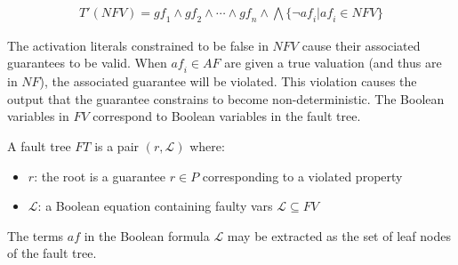 \begin{gather*}
T'(\mathit{NFV}) = \mathit{gf}_1 \land \mathit{gf}_2 \land \cdots \land \mathit{gf}_n \land \bigwedge \{\neg \mathit{af}_i | \mathit{af}_i \in \mathit{NFV} \}
\end{gather*}

The activation literals constrained to be false in $\mathit{NFV}$ cause their associated guarantees to be valid. When $\mathit{af}_i \in \mathit{AF}$ are given a true valuation (and thus are in $\mathit{NF}$), the associated guarantee will be violated. This violation causes the output that the guarantee constrains to become non-deterministic. The Boolean variables in $\mathit{FV}$ correspond to Boolean variables in the fault tree. 



\begin{definition}
A fault tree $\mathit{FT}$ is a pair $(r, \mathcal{L})$ where:
\begin{itemize}
\item[] $r$: the root is a guarantee $r \in P$ corresponding to a violated property
\item[] $\mathcal{L}$: a Boolean equation containing faulty vars $\mathcal{L} \subseteq \mathit{FV}$
\end{itemize}
\end{definition}

The terms $\mathit{af}$  in the Boolean formula $\mathcal{L}$ may be extracted as the set of leaf nodes of the fault tree. 

